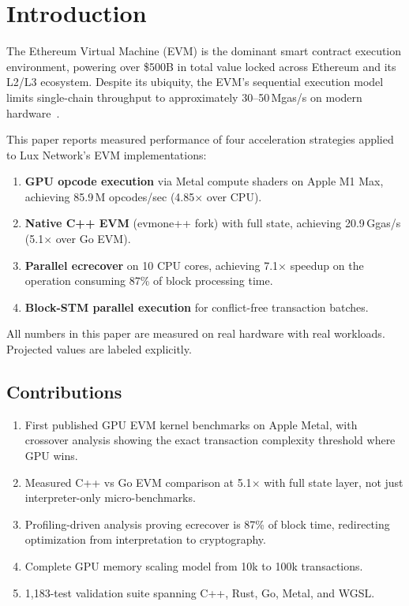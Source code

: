 \section{Introduction}


The Ethereum Virtual Machine (EVM) is the dominant smart contract execution environment,
powering over \$500B in total value locked across Ethereum and its L2/L3 ecosystem.
Despite its ubiquity, the EVM's sequential execution model limits single-chain throughput
to approximately 30--50\,Mgas/s on modern hardware~\cite{pevm,reth}.

This paper reports measured performance of four acceleration strategies applied to Lux
Network's EVM implementations:

\begin{enumerate}
\item \textbf{GPU opcode execution} via Metal compute shaders on Apple M1 Max, achieving
      85.9\,M opcodes/sec (4.85$\times$ over CPU).
\item \textbf{Native C++ EVM} (evmone++ fork) with full state, achieving 20.9\,Ggas/s
      (5.1$\times$ over Go EVM).
\item \textbf{Parallel ecrecover} on 10 CPU cores, achieving 7.1$\times$ speedup on the
      operation consuming 87\% of block processing time.
\item \textbf{Block-STM parallel execution} for conflict-free transaction batches.
\end{enumerate}

All numbers in this paper are measured on real hardware with real workloads. Projected
values are labeled explicitly.

\subsection{Contributions}

\begin{enumerate}
\item First published GPU EVM kernel benchmarks on Apple Metal, with crossover analysis
      showing the exact transaction complexity threshold where GPU wins.
\item Measured C++ vs Go EVM comparison at 5.1$\times$ with full state layer, not just
      interpreter-only micro-benchmarks.
\item Profiling-driven analysis proving ecrecover is 87\% of block time, redirecting
      optimization from interpretation to cryptography.
\item Complete GPU memory scaling model from 10k to 100k transactions.
\item 1{,}183-test validation suite spanning C++, Rust, Go, Metal, and WGSL.
\end{enumerate}


